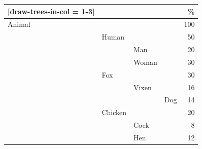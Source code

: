\documentclass{article}
\begin{document}
\thispagestyle{empty}


\renewcommand{\arraystretch}{1.3}

\begin{NiceTabular}{
    *{3}{w{l}{2.5mm}} l r
}[draw-trees-in-col = 1-3]
    \toprule
    \RowStyle{\bfseries}
     &&&& \% \\
    \midrule
    Animal   &&&& 100 \\
    & Human   &&&  50 \\
    && Man     &&  20 \\
    && Woman   &&  30 \\
    & Fox     &&&  30 \\
    && Vixen   &&  16 \\
    &&& Dog     &  14 \\
    & Chicken &&&  20 \\
    && Cock    &&   8 \\
    && Hen     &&  12 \\
    \bottomrule
\end{NiceTabular}
\end{document}
